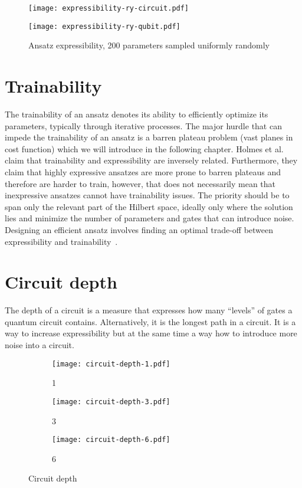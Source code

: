 \begin{figure}[H]
    \centering
    \begin{minipage}{0.4\linewidth}
        \centering
        \texttt{[image: expressibility-ry-circuit.pdf]}
    \end{minipage}
    \begin{minipage}{0.4\linewidth}
        \centering
        \texttt{[image: expressibility-ry-qubit.pdf]}
    \end{minipage}
    \caption{Ansatz expressibility, 200 parameters sampled uniformly randomly}
\end{figure}

\section{Trainability}
The trainability of an ansatz denotes its ability to efficiently optimize its parameters, typically through iterative processes. The major hurdle that can impede the trainability of an ansatz is a barren plateau problem (vast planes in cost function) which we will introduce in the following chapter. Holmes et al.~\cite{holmes2022} claim that trainability and expressibility are inversely related. Furthermore, they claim that highly expressive ansatzes are more prone to barren plateaus and therefore are harder to train, however, that does not necessarily mean that inexpressive ansatzes cannot have trainability issues. The priority should be to span only the relevant part of the Hilbert space, ideally only where the solution lies and minimize the number of parameters and gates that can introduce noise. Designing an efficient ansatz involves finding an optimal trade-off between expressibility and trainability~\cite{holmes2022}.

\section{Circuit depth}
The depth of a circuit is a measure that expresses how many ``levels'' of gates a quantum circuit contains. Alternatively, it is the longest path in a circuit. It is a way to increase expressibility but at the same time a way how to introduce more noise into a circuit.

\begin{figure}[H]
    \centering
    \begin{subfigure}[b]{0.2\textwidth}
        \centering
        \texttt{[image: circuit-depth-1.pdf]} 
        \caption*{1}
    \end{subfigure}
    \hfill
    \begin{subfigure}[b]{0.3\textwidth}
        \centering
        \texttt{[image: circuit-depth-3.pdf]}
        \caption*{3}
    \end{subfigure}
    \hfill
    \begin{subfigure}[b]{0.45\textwidth}
        \centering
        \texttt{[image: circuit-depth-6.pdf]}
        \caption*{6}
    \end{subfigure}
       \caption{Circuit depth}
       \label{fig:circuit-depth}
\end{figure}


